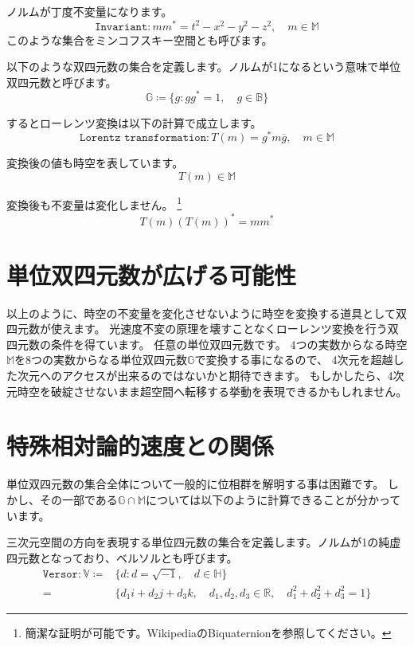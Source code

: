 \documentclass[a4paper,12pt]{jsreport}
\begin{document}
ノルムが丁度不変量になります。
\begin{equation}
\texttt{Invariant}:mm^*=t^2-x^2-y^2-z^2,\quad m\in\mathbb{M}
\end{equation}
このような集合をミンコフスキー空間とも呼びます。

以下のような双四元数の集合を定義します。ノルムが1になるという意味で単位双四元数と呼びます。
\begin{equation}
\mathbb{G}\coloneq\{g:gg^*=1,\quad g\in\mathbb{B}\}
\end{equation}

するとローレンツ変換は以下の計算で成立します。
\begin{equation}
\texttt{Lorentz transformation}:T(m)=g^*m\overline{g},\quad m\in\mathbb{M}
\end{equation}

変換後の値も時空を表しています。
\begin{equation}
T(m)\in\mathbb{M}
\end{equation}

変換後も不変量は変化しません。
\footnote{簡潔な証明が可能です。WikipediaのBiquaternionを参照してください。}
\begin{equation}
T(m)(T(m))^*=mm^*
\end{equation}

\section{単位双四元数が広げる可能性}

以上のように、時空の不変量を変化させないように時空を変換する道具として双四元数が使えます。
光速度不変の原理を壊すことなくローレンツ変換を行う双四元数の条件を得ています。
任意の単位双四元数です。
4つの実数からなる時空$\mathbb{M}$を8つの実数からなる単位双四元数$\mathbb{G}$で変換する事になるので、
4次元を超越した次元へのアクセスが出来るのではないかと期待できます。
もしかしたら、4次元時空を破綻させないまま超空間へ転移する挙動を表現できるかもしれません。

\section{特殊相対論的速度との関係}

単位双四元数の集合全体について一般的に位相群を解明する事は困難です。
しかし、その一部である$\mathbb{G}\cap\mathbb{M}$については以下のように計算できることが分かっています。

三次元空間の方向を表現する単位四元数の集合を定義します。ノルムが1の純虚四元数となっており、ベルソルとも呼びます。
\begin{equation}
\begin{split}
\texttt{Versor}:\mathbb{V}\coloneq&\{d:d=\sqrt{-1},\quad d\in\mathbb{H}\}\\
=&\{d_1i+d_2j+d_3k,\quad d_1,d_2,d_3\in\mathbb{R},\quad d_1^2+d_2^2+d_3^2=1\}
\end{split}
\end{equation}
\end{document}
